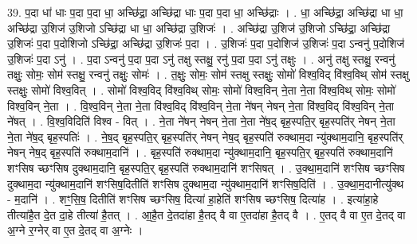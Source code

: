 \documentclass[17pt]{extarticle}
\begin{document}
39. प॒दा धा॑ धाः प॒दा प॒दा धा॒ अच्छि॑द्रा॒ अच्छि॑द्रा धाः प॒दा प॒दा धा॒ अच्छि॑द्राः । . धा॒ अच्छि॑द्रा॒ अच्छि॑द्रा धा धा॒ अच्छि॑द्रा उ॒शिज॑ उ॒शिजो ऽच्छि॑द्रा धा धा॒ अच्छि॑द्रा उ॒शिजः॑ । . अच्छि॑द्रा उ॒शिज॑ उ॒शिजो ऽच्छि॑द्रा॒ अच्छि॑द्रा उ॒शिजः॑ प॒दा प॒दोशिजो ऽच्छि॑द्रा॒ अच्छि॑द्रा उ॒शिजः॑ प॒दा । . उ॒शिजः॑ प॒दा प॒दोशिज॑ उ॒शिजः॑ प॒दा ऽन्वनु॑ प॒दोशिज॑ उ॒शिजः॑ प॒दा ऽनु॑ । . प॒दा ऽन्वनु॑ प॒दा प॒दा ऽनु॑ तक्षु स्तक्षु॒ रनु॑ प॒दा प॒दा ऽनु॑ तक्षुः । . अनु॑ तक्षु स्तक्षु॒ रन्वनु॑ तक्षुः॒ सोमः॒ सोम॑ स्तक्षु॒ रन्वनु॑ तक्षुः॒ सोमः॑ । . त॒क्षुः॒ सोमः॒ सोम॑ स्तक्षु स्तक्षुः॒ सोमो॑ विश्व॒विद् वि॑श्व॒विथ् सोम॑ स्तक्षु स्तक्षुः॒ सोमो॑ विश्व॒वित् । . सोमो॑ विश्व॒विद् वि॑श्व॒विथ् सोमः॒ सोमो॑ विश्व॒विन् ने॒ता ने॒ता वि॑श्व॒विथ् सोमः॒ सोमो॑ विश्व॒विन् ने॒ता । . वि॒श्व॒विन् ने॒ता ने॒ता वि॑श्व॒विद् वि॑श्व॒विन् ने॒ता ने॑षन् नेषन् ने॒ता वि॑श्व॒विद् वि॑श्व॒विन् ने॒ता ने॑षत् । . वि॒श्व॒विदिति॑ विश्व - वित् । . ने॒ता ने॑षन् नेषन् ने॒ता ने॒ता ने॑ष॒द् बृह॒स्पति॒र् बृह॒स्पति॑र् नेषन् ने॒ता ने॒ता ने॑ष॒द् बृह॒स्पतिः॑ । . ने॒ष॒द् बृह॒स्पति॒र् बृह॒स्पति॑र् नेषन् नेष॒द् बृह॒स्पति॑ रुक्थाम॒दा न्यु॑क्थाम॒दानि॒ बृह॒स्पति॑र् नेषन् नेष॒द् बृह॒स्पति॑ रुक्थाम॒दानि॑ । . बृह॒स्पति॑ रुक्थाम॒दा न्यु॑क्थाम॒दानि॒ बृह॒स्पति॒र् बृह॒स्पति॑ रुक्थाम॒दानि॑ शꣳसिष च्छꣳसिष दुक्थाम॒दानि॒ बृह॒स्पति॒र् बृह॒स्पति॑ रुक्थाम॒दानि॑ शꣳसिषत् । . उ॒क्था॒म॒दानि॑ शꣳसिष च्छꣳसिष दुक्थाम॒दा न्यु॑क्थाम॒दानि॑ शꣳसिष॒दितीति॑ शꣳसिष दुक्थाम॒दा न्यु॑क्थाम॒दानि॑ शꣳसिष॒दिति॑ । . उ॒क्था॒म॒दानीत्यु॑क्थ - म॒दानि॑ । . शꣳ॒॒सि॒ष॒ दितीति॑ शꣳसिष च्छꣳसिष॒ दित्या॑ हा॒हेति॑ शꣳसिष च्छꣳसिष॒ दित्या॑ह । . इत्या॑हा॒हे तीत्या॑है॒त दे॒त दा॒हे तीत्या॑ है॒तत् । . आ॒है॒त दे॒तदा॑हा है॒तद् वै वा ए॒तदा॑हा है॒तद् वै । . ए॒तद् वै वा ए॒त दे॒तद् वा अ॒ग्ने र॒ग्नेर् वा ए॒त दे॒तद् वा अ॒ग्नेः । \newline
\end{document}
